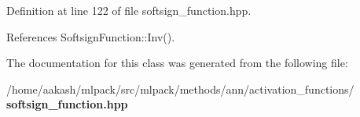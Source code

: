 Definition at line 122 of file softsign\+\_\+function.\+hpp.



References Softsign\+Function\+::\+Inv().



The documentation for this class was generated from the following file\+:\begin{DoxyCompactItemize}
\item 
/home/aakash/mlpack/src/mlpack/methods/ann/activation\+\_\+functions/\textbf{ softsign\+\_\+function.\+hpp}\end{DoxyCompactItemize}

